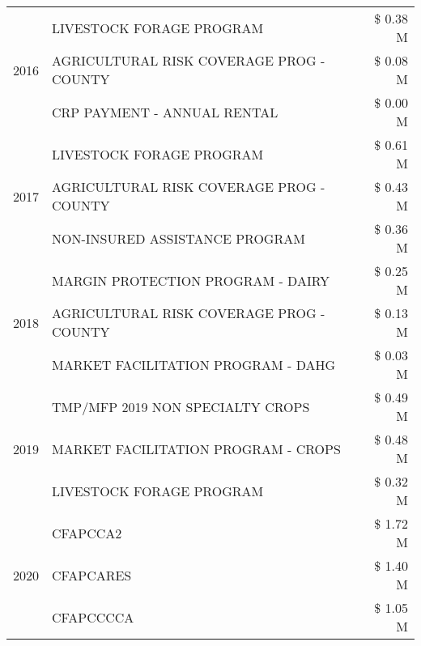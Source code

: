 \begin{tabular}{llr}
\cline{1-3}
\multirow[t]{3}{*}{2016} & LIVESTOCK FORAGE PROGRAM & \$ 0.38 M \\
 & AGRICULTURAL RISK COVERAGE PROG - COUNTY & \$ 0.08 M \\
 & CRP PAYMENT - ANNUAL RENTAL & \$ 0.00 M \\
\cline{1-3}
\multirow[t]{3}{*}{2017} & LIVESTOCK FORAGE PROGRAM & \$ 0.61 M \\
 & AGRICULTURAL RISK COVERAGE PROG - COUNTY & \$ 0.43 M \\
 & NON-INSURED ASSISTANCE PROGRAM & \$ 0.36 M \\
\cline{1-3}
\multirow[t]{3}{*}{2018} & MARGIN PROTECTION PROGRAM - DAIRY & \$ 0.25 M \\
 & AGRICULTURAL RISK COVERAGE PROG - COUNTY & \$ 0.13 M \\
 & MARKET FACILITATION PROGRAM - DAHG & \$ 0.03 M \\
\cline{1-3}
\multirow[t]{3}{*}{2019} & TMP/MFP 2019 NON SPECIALTY CROPS & \$ 0.49 M \\
 & MARKET FACILITATION PROGRAM - CROPS & \$ 0.48 M \\
 & LIVESTOCK FORAGE PROGRAM & \$ 0.32 M \\
\cline{1-3}
\multirow[t]{3}{*}{2020} & CFAPCCA2 & \$ 1.72 M \\
 & CFAPCARES & \$ 1.40 M \\
 & CFAPCCCCA & \$ 1.05 M \\
\cline{1-3}
\bottomrule
\end{tabular}
